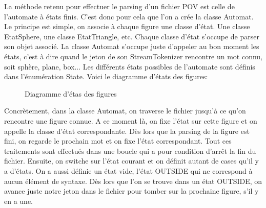 \documentclass[../../Rapport RayTracer]{subfiles}
\begin{document}
La méthode retenu pour effectuer le parsing d'un fichier POV est celle de l'automate à états finis. C'est donc pour cela que l'on a crée la classe Automat. Le principe est simple, on associe à chaque figure une classe d'état. Une classe EtatSphere, une classe EtatTriangle, etc. Chaque classe d'état s'occupe de parser son objet associé. La classe Automat s'occupe juste d'appeler au bon moment les états, c'est à dire quand le jeton de son StreamTokenizer rencontre un mot connu, soit sphère, plane, box... Les différents états possibles de l'automate sont définis dans l'énumération State. 
Voici le diagramme d'états des figures:

\begin{figure}[h!]
	
	\caption{Diagramme d'étas des figures}
	\label{diagrammeEtatFigure}
\end{figure}
\FloatBarrier


Concrètement, dans la classe Automat, on traverse le fichier jusqu'à ce qu'on rencontre une figure connue. A ce moment là, on fixe l'état sur cette figure et on appelle la classe d'état correspondante. Dès lors que la parsing de la figure est fini, on regarde le prochain mot et on fixe l'état correspondant. Tout ces traitements sont effectués dans une boucle qui a pour condition d'arrêt la fin du fichier. Ensuite, on switche sur l'état courant et on définit autant de cases qu'il y a d'états. On a aussi définie un état vide, l'état OUTSIDE qui ne correspond à aucun élément de syntaxe. Dès lors que l'on se trouve dans un état OUTSIDE, on avance juste notre jeton dans le fichier pour tomber sur la prochaine figure, s'il y en a une.
\end{document}
